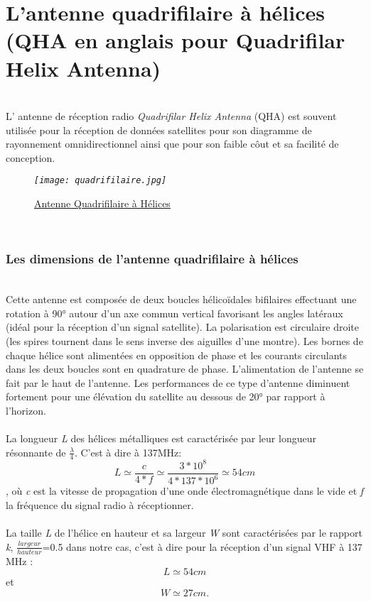 \documentclass[12pt,fleqn]{book} %
\begin{document}
\section{L'antenne quadrifilaire à hélices (QHA en anglais pour Quadrifilar Helix Antenna)}
~\\\indent L' antenne de réception radio \emph{Quadrifilar Helix Antenna} (QHA) est souvent utilisée pour la réception de données satellites pour son diagramme de rayonnement omnidirectionnel ainsi que pour son faible côut et sa facilité de conception.
\begin{figure}[H]
	\centering
	\itshape
	\texttt{[image: quadrifilaire.jpg]}
	\caption{\label{QHA} \underline{Antenne Quadrifilaire à Hélices}}
\end{figure}
~\\
\subsubsection{Les dimensions de l'antenne quadrifilaire à hélices}
~\\
Cette antenne est composée de deux boucles hélicoïdales bifilaires effectuant une rotation à 90° autour d'un axe commun vertical favorisant les angles latéraux (idéal pour la réception d'un signal satellite). La polarisation est circulaire droite (les spires tournent dans le sens inverse des aiguilles d'une montre). Les bornes de chaque hélice sont alimentées en opposition de phase et les courants circulants dans les deux boucles sont en quadrature de phase. L'alimentation de l'antenne se fait par le haut de l'antenne. Les performances de ce type d'antenne diminuent fortement pour une élévation du satellite au dessous de 20° par rapport à l'horizon.
~\\\\La longueur \emph{L} des hélices métalliques est caractérisée par leur longueur résonnante de \(\frac{\lambda}{4}\). C'est à dire à 137MHz:
$$ L\simeq\frac{c}{4*f}\simeq\frac{3*10^8}{4*137*10^6}\simeq54 cm $$, où \emph{c} est la vitesse de propagation d'une onde électromagnétique dans le vide et \emph{f} la fréquence du signal radio à réceptionner.
~\\\\La taille \emph{L} de l'hélice en hauteur et sa largeur \emph{W} sont caractérisées par le rapport \emph{k}, \(\frac{largeur}{hauteur}\)=0.5 dans notre cas, c'est à dire pour la réception d'un signal VHF à 137 MHz : 
$$ L\simeq54 cm $$
et 
$$ W\simeq27 cm. $$
\end{document}
